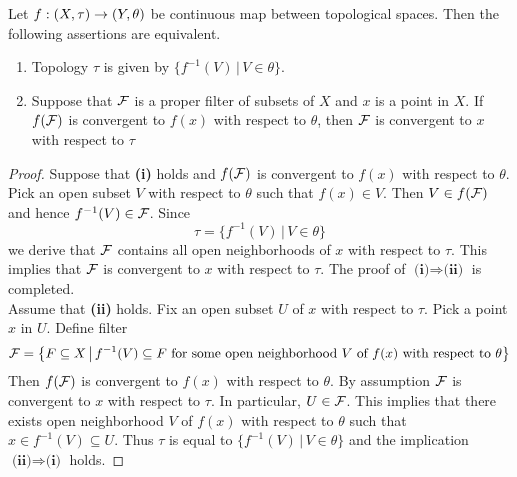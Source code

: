 \begin{proposition}\label{proposition:topological_embeddings_described_by_filters}
Let $f:\left(X,\tau\right) \rightarrow \left(Y,\theta\right)$ be continuous map between topological spaces. Then the following assertions are equivalent.
\begin{enumerate}[label=\emph{\textbf{(\roman*)}}, leftmargin=*]
\item Topology $\tau$ is given by $\big\{f^{-1}(V)\,\big|\,V\in \theta\big\}$.
\item Suppose that ${\mathcal F}$ is a proper filter of subsets of $X$ and $x$ is a point in $X$. If $f({\mathcal F})$ is convergent to $f(x)$ with respect to $\theta$, then ${\mathcal F}$ is convergent to $x$ with respect to $\tau$
\end{enumerate}
\end{proposition}
\begin{proof}
Suppose that \textbf{(i)} holds and $f({\mathcal F})$ is convergent to $f(x)$ with respect to $\theta$. Pick an open subset $V$ with respect to $\theta$ such that $f(x) \in V$. Then $V \in f({\mathcal F})$ and hence $f^{-1}(V) \in {\mathcal F}$. Since
$$\tau = \big\{f^{-1}(V)\,\big|\,V\in \theta\big\}$$
we derive that ${\mathcal F}$ contains all open neighborhoods of $x$ with respect to $\tau$. This implies that ${\mathcal F}$ is convergent to $x$ with respect to $\tau$. The proof of $\textbf{(i)}\Rightarrow \textbf{(ii)}$ is completed.\\
Assume that \textbf{(ii)} holds. Fix an open subset $U$ of $x$ with respect to $\tau$. Pick a point $x$ in $U$. Define filter
$${\mathcal F} = \big\{F\subseteq X\,\big|\,f^{-1}(V)\subseteq F\mbox{ for some open neighborhood }V\mbox{ of }f(x)\mbox{ with respect to }\theta\big\}$$
Then $f({\mathcal F})$ is convergent to $f(x)$ with respect to $\theta$. By assumption ${\mathcal F}$ is convergent to $x$ with respect to $\tau$. In particular, $U \in {\mathcal F}$. This implies that there exists open neighborhood $V$ of $f(x)$ with respect to $\theta$ such that $x \in f^{-1}(V) \subseteq U$. Thus $\tau$ is equal to $\big\{f^{-1}(V)\,\big|\,V\in \theta\big\}$ and the implication $\textbf{(ii)}\Rightarrow \textbf{(i)}$ holds.
\end{proof}

